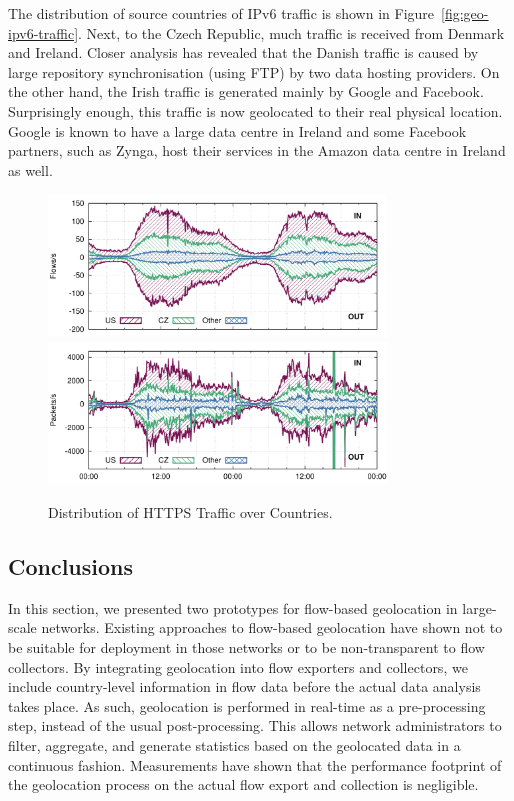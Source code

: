The distribution of source countries of IPv6 traffic is shown in Figure~\ref{fig:geo-ipv6-traffic}. Next, to the Czech Republic, much traffic is received from Denmark and Ireland. Closer analysis has revealed that the Danish traffic is caused by large repository synchronisation (using FTP) by two data hosting providers. On the other hand, the Irish traffic is generated mainly by Google and Facebook. Surprisingly enough, this traffic is now geolocated to their real physical location. Google is known to have a large data centre in Ireland and some Facebook partners, such as Zynga, host their services in the Amazon data centre in Ireland as well.

\begin{figure}[!tb]
    \centering
    \includegraphics[width=0.8\textwidth]{figures/paper-geolocation/https/flows}
    \includegraphics[width=0.8\textwidth]{figures/paper-geolocation/https/packets}
    \caption{Distribution of HTTPS Traffic over Countries.}
    \label{fig:geo-https-traffic}
\end{figure}

\subsection{Conclusions} \label{subsec:geo-conclusions}

In this section, we presented two prototypes for flow-based geolocation in large-scale networks. Existing approaches to flow-based geolocation have shown not to be suitable for deployment in those networks or to be non-transparent to flow collectors. By integrating geolocation into flow exporters and collectors, we include country-level information in flow data before the actual data analysis takes place. As such, geolocation is performed in real-time as a pre-processing step, instead of the usual post-processing. This allows network administrators to filter, aggregate, and generate statistics based on the geolocated data in a continuous fashion. Measurements have shown that the performance footprint of the geolocation process on the actual flow export and collection is negligible.

